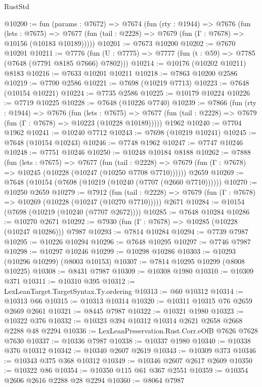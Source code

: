 \begin{lexlean}{RustStd}
\begin{coremodule}
{\begin{coremodule}
{{{{{{{{{{{{{{{{{{{{{{{{{{{{{{{{{{{{{{{{{{{{{{{{{{{{{@10200 := fun (params : @7672) =>
  @7674
    (fun (rty : @1944) =>
    @7676
      (fun (lets : @7675) =>
      @7677 (fun (tail : @2228) => @7679 (fun (Γ : @7678) => @10156 (@10183 @10189)))))
@10201 := @7673 @10200
@10202 := @7670 @10201
@10211 := @7776
    (fun (U : @7775) => @7777 (fun (t : @59) => @7785 (@7648 (@7791 @8185 @7666) @7802)))
@10214 := @10176 (@10202 @10211) @8183
@10216 := @7633 @10201 @10211
@10218 := @7863 @10200 @2586
@10219 := @7700 @2586
@10221 := @7698 (@10219 @7713)
@10223 := @7648 (@10154 @10221)
@10224 := @7735 @2586
@10225 := @10179 @10224
@10226 := @7719 @10225
@10228 := @7648 (@10226 @7740)
@10239 := @7866
    (fun (rty : @1944) =>
    @7676
      (fun (lets : @7675) =>
      @7677 (fun (tail : @2228) => @7679 (fun (Γ : @7678) => @10223 (@10228 @10189)))))
    @1962
@10240 := @7704 @1962
@10241 := @10240 @7712
@10243 := @7698 (@10219 @10241)
@10245 := @7648 (@10154 @10243)
@10246 := @7748 @1962
@10247 := @7747 @10246
@10248 := @7751 @10246
@10250 := @10248 @10184 @8188
@10262 := @7888
    (fun (lets : @7675) =>
    @7677
      (fun (tail : @2228) =>
      @7679 (fun (Γ : @7678) => @10245 (@10228 (@10247 (@10250 @7708 @7710))))))
    @2659
@10269 := @7648 (@10154 (@7698 (@10219 (@10240 (@7707 (@2660 @7710))))))
@10270 := @10250 @2659
@10279 := @7912
    (fun (tail : @2228) => @7679 (fun (Γ : @7678) => @10269 (@10228 (@10247 (@10270 @7710)))))
    @2671
@10284 := @10154 (@7698 (@10219 (@10240 (@7707 @2672))))
@10285 := @7648 @10284
@10286 := @10270 @2671
@10292 := @7930 (fun (Γ : @7678) => @10285 (@10228 (@10247 @10286))) @7987
@10293 := @7814 @10284
@10294 := @7739 @7987
@10295 := @10226 @10294
@10296 := @7648 @10295
@10297 := @7746 @7987
@10298 := @10297 @10246
@10299 := @10298 @10286
@10303 := @10293 (@10296 @10299) (@8003 @10153)
@10307 := @7814 @10295 @10299 (@8008 @10225)
@10308 := @8431 @7987
@10309 := @10308 @1980
@10310 := @10309 @371
@10311 := @10310 @395
@10312 := LexLeanTarget.TargetSyntax.Ty.ordering
@10313 := @60 @10312
@10314 := @10313 @66
@10315 := @10313 @10314
@10320 := @10311 @10315 @76 @2659 @2669 @2661
@10321 := @8445 @7987
@10322 := @10321 @1980
@10323 := @10322 @376
@10332 := @10323 @394 @10312 @10314 @2621 @2658 @2668 @2288 @48 @2294
@10336 := LexLeanPreservation.Rust.Corr.eOfB @7626 @7628 @7630
@10337 := @10336 @7987
@10338 := @10337 @1980
@10340 := @10338 @376 @10312
@10342 := @10340 @2607 @2619
@10343 := @10309 @373
@10346 := @10343 @375 @368 @10312
@10349 := @10346 @2607 @2617 @2609
@10350 := @10322 @86
@10354 := @10350 @115 @61 @367 @2551
@10359 := @10354 @2606 @2616 @2288 @28 @2294
@10360 := @8064 @7987
}}}}}}}}}}}}}}}}}}}}}}}}}}}}}}}}}}}}}}}}}}}}}}}}}}}}}
\end{coremodule}}
\end{coremodule}
\end{lexlean}

